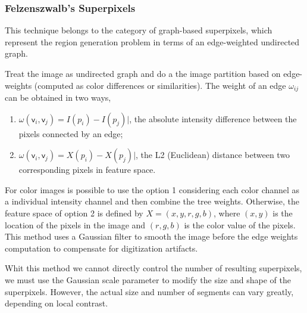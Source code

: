 \subsubsection{Felzenszwalb's Superpixels}

This technique belongs to the category of graph-based superpixels, which represent the region generation problem in terms of an edge-weighted undirected graph. 

Treat the image as undirected graph and do a the image partition based on edge-weights  (computed as color differences or similarities). The weight of an edge  $\omega_{ij}$
can be obtained in two ways,
\begin{enumerate}
	\item $\omega(\mathsf{v}_i, \mathsf{v}_j)= I(p_i) - I(p_j)|$, the absolute intensity difference between the pixels connected by an edge; 
	\item $\omega(\mathsf{v}_i, \mathsf{v}_j)= X(p_i) - X(p_j)|$, the L2 (Euclidean)
distance between two corresponding pixels in feature space.
\end{enumerate}

For color images is possible to use the option 1 considering each color channel as a individual intensity channel and then combine the tree weights. Otherwise, the feature space of option 2 is defined by $X = (x, y,r, g, b)$, where $(x, y)$ is the location of the pixels in the image and $(r, g, b)$ is the color value of the pixels. This method uses a Gaussian filter to smooth the image before the edge weights computation to compensate for digitization artifacts. 

Whit this method we cannot directly control the number of resulting superpixels, we must use the Gaussian scale parameter to modify the size and shape of the superpixels. However, the actual size and number of segments can vary greatly, depending on local contrast.

